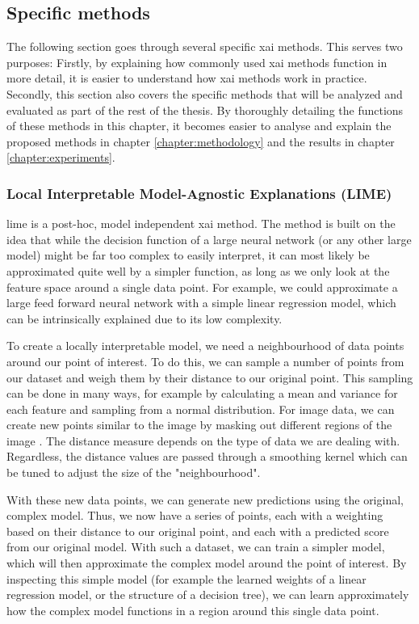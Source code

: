 \documentclass[UKenglish]{uiomasterthesis} %
\theoremstyle{definition}
\begin{document}
\subsection{Specific methods}


The following section goes through several specific \ac{xai} methods. This serves two purposes: Firstly, by explaining how commonly used \ac{xai} methods function in more detail, it is easier to understand how \ac{xai} methods work in practice. Secondly, this section also covers the specific methods that will be analyzed and evaluated as part of the rest of the thesis. By thoroughly detailing the functions of these methods in this chapter, it becomes easier to analyse and explain the proposed methods in chapter \ref{chapter:methodology} and the results in chapter \ref{chapter:experiments}.
\\


\subsubsection{Local Interpretable Model-Agnostic Explanations (LIME)}

\ac{lime} \cite{lime} is a post-hoc, model independent \ac{xai} method. The method is built on the idea that while the decision function of a large neural network (or any other large model) might be far too complex to easily interpret, it can most likely be approximated quite well by a simpler function, as long as we only look at the feature space around a single data point. For example, we could approximate a large feed forward neural network with a simple linear regression model, which can be intrinsically explained due to its low complexity.

To create a locally interpretable model, we need a neighbourhood of data points around our point of interest. To do this, we can sample a number of points from our dataset and weigh them by their distance to our original point. This sampling can be done in many ways, for example by calculating a mean and variance for each feature and sampling from a normal distribution. For image data, we can create new points similar to the image by masking out different regions of the image \cite{molnar}. The distance measure depends on the type of data we are dealing with. Regardless, the distance values are passed through a smoothing kernel which can be tuned to adjust the size of the "neighbourhood".

With these new data points, we can generate new predictions using the original, complex model. Thus, we now have a series of points, each with a weighting based on their distance to our original point, and each with a predicted score from our original model. With such a dataset, we can train a simpler model, which will then approximate the complex model around the point of interest. By inspecting this simple model (for example the learned weights of a linear regression model, or the structure of a decision tree), we can learn approximately how the complex model functions in a region around this single data point.
\end{document}
